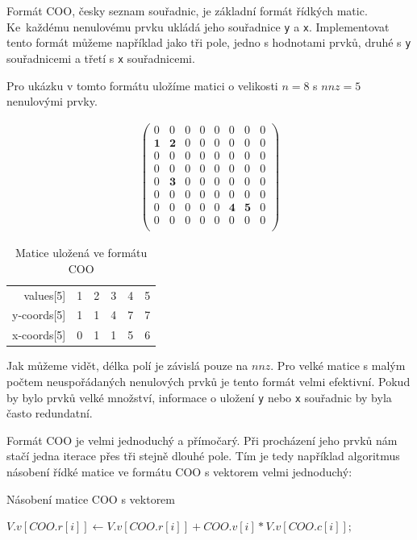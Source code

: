 Formát COO, česky seznam souřadnic, je základní formát řídkých matic. Ke~každému nenulovému prvku ukládá jeho souřadnice \texttt{y} a \texttt{x}. Implementovat tento formát můžeme například jako tři pole, jedno s hodnotami prvků, druhé s \texttt{y} souřadnicemi a třetí s \texttt{x} souřadnicemi.

Pro ukázku v tomto formátu uložíme matici o velikosti $n=8$ s $nnz=5$ nenulovými prvky.

\begin{align}
\begin{pmatrix}
	0 & 0 & 0 & 0 & 0 & 0 & 0 & 0 \\
	\boldsymbol{1} & \boldsymbol{2} & 0 & 0 & 0 & 0 & 0 & 0 \\
	0 & 0 & 0 & 0 & 0 & 0 & 0 & 0 \\
	0 & 0 & 0 & 0 & 0 & 0 & 0 & 0 \\
	0 & \boldsymbol{3} & 0 & 0 & 0 & 0 & 0 & 0 \\
	0 & 0 & 0 & 0 & 0 & 0 & 0 & 0 \\
	0 & 0 & 0 & 0 & 0 & \boldsymbol{4} & \boldsymbol{5} & 0 \\
	0 & 0 & 0 & 0 & 0 & 0 & 0 & 0 \\	
\end{pmatrix}
\end{align}

\begin{table}[H]
    \begin{tabular}{r|lllll}
    values[5]   & 1 & 2 & 3 & 4 & 5 \\
    y-coords[5] & 1 & 1 & 4 & 7 & 7 \\
    x-coords[5] & 0 & 1 & 1 & 5 & 6 \\
    \end{tabular}
    \caption{Matice uložená ve formátu COO}
\end{table}

Jak můžeme vidět, délka polí je závislá pouze na $nnz$. Pro velké matice s malým počtem neuspořádaných nenulových prvků je tento formát velmi efektivní. Pokud by bylo prvků velké množství, informace o uložení \texttt{y} nebo \texttt{x} souřadnic by byla často redundatní.

Formát COO je velmi jednoduchý a přímočarý. Při procházení jeho prvků nám stačí jedna iterace přes tři stejně dlouhé pole. Tím je tedy například algoritmus násobení řídké matice ve formátu COO s vektorem velmi jednoduchý:

\begin{algorithm}[H]
	\caption{Násobení matice COO s vektorem}\label{coo-mvm}
	\begin{algorithmic}[1]
			\State \texttt{$V.v[COO.r[i]] \gets V.v[COO.r[i]] + COO.v[i] * V.v[COO.c[i]];$}
		\EndFor
		\EndProcedure
	\end{algorithmic}
\end{algorithm}


